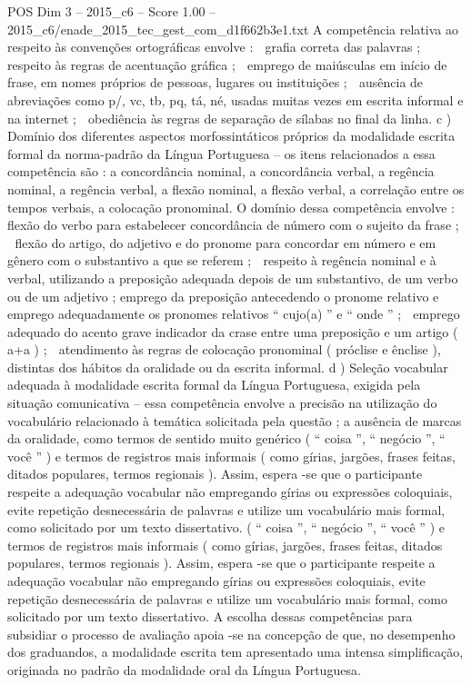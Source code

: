 \begin{textsample}{POS Dim 3 – 2015\_c6 – Score 1.00 – 2015\_c6/enade\_2015\_tec\_gest\_com\_d1f662b3e1.txt}
A competência relativa ao respeito às convenções ortográficas envolve :  grafia correta das palavras ;  respeito às regras de acentuação gráfica ;  emprego de maiúsculas em início de frase, em nomes próprios de pessoas, lugares ou instituições ;  ausência de abreviações como p/, vc, tb, pq, tá, né, usadas muitas vezes em escrita informal e na internet ;  obediência às regras de separação de sílabas no final da linha. c ) Domínio dos diferentes aspectos morfossintáticos próprios da modalidade escrita formal da norma-padrão da Língua Portuguesa – os itens relacionados a essa competência são : a concordância nominal, a concordância verbal, a regência nominal, a regência verbal, a flexão nominal, a flexão verbal, a correlação entre os tempos verbais, a colocação pronominal.
O domínio dessa competência envolve :  flexão do verbo para estabelecer concordância de número com o sujeito da frase ;  flexão do artigo, do adjetivo e do pronome para concordar em número e em gênero com o substantivo a que se referem ;  respeito à regência nominal e à verbal, utilizando a preposição adequada depois de um substantivo, de um verbo ou de um adjetivo ; emprego da preposição antecedendo o pronome relativo e emprego adequadamente os pronomes relativos “ cujo(a) ” e “ onde ” ;  emprego adequado do acento grave indicador da crase entre uma preposição e um artigo ( a+a ) ;  atendimento às regras de colocação pronominal ( próclise e ênclise ), distintas dos hábitos da oralidade ou da escrita informal. d ) Seleção vocabular adequada à modalidade escrita formal da Língua Portuguesa, exigida pela situação comunicativa – essa competência envolve a precisão na utilização do vocabulário relacionado à temática solicitada pela questão ; a ausência de marcas da oralidade, como termos de sentido muito genérico ( “ coisa ”, “ negócio ”, “ você ” ) e termos de registros mais informais ( como gírias, jargões, frases feitas, ditados populares, termos regionais ).
Assim, espera -se que o participante respeite a adequação vocabular não empregando gírias ou expressões coloquiais, evite repetição desnecessária de palavras e utilize um vocabulário mais formal, como solicitado por um texto dissertativo. ( “ coisa ”, “ negócio ”, “ você ” ) e termos de registros mais informais ( como gírias, jargões, frases feitas, ditados populares, termos regionais ).
Assim, espera -se que o participante respeite a adequação vocabular não empregando gírias ou expressões coloquiais, evite repetição desnecessária de palavras e utilize um vocabulário mais formal, como solicitado por um texto dissertativo.
A escolha dessas competências para subsidiar o processo de avaliação apoia -se na concepção de que, no desempenho dos graduandos, a modalidade escrita tem apresentado uma intensa simplificação, originada no padrão da modalidade oral da Língua Portuguesa.

\end{textsample}
